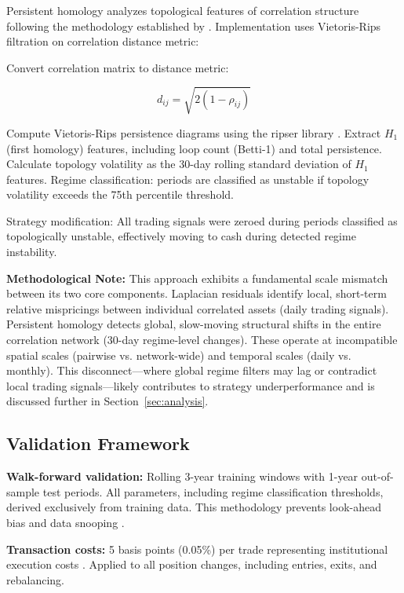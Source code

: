 Persistent homology analyzes topological features of correlation structure following the methodology established by \citet{Gidea2018}. Implementation uses Vietoris-Rips filtration on correlation distance metric:

Convert correlation matrix to distance metric:

\begin{equation}
d_{ij} = \sqrt{2(1 - \rho_{ij})}
\end{equation}

Compute Vietoris-Rips persistence diagrams using the ripser library \citep{Tralie2018}. Extract $H_1$ (first homology) features, including loop count (Betti-1) and total persistence. Calculate topology volatility as the 30-day rolling standard deviation of $H_1$ features. Regime classification: periods are classified as unstable if topology volatility exceeds the 75th percentile threshold.

Strategy modification: All trading signals were zeroed during periods classified as topologically unstable, effectively moving to cash during detected regime instability.

\textbf{Methodological Note:} This approach exhibits a fundamental scale mismatch between its two core components. Laplacian residuals identify local, short-term relative mispricings between individual correlated assets (daily trading signals). Persistent homology detects global, slow-moving structural shifts in the entire correlation network (30-day regime-level changes). These operate at incompatible spatial scales (pairwise vs. network-wide) and temporal scales (daily vs. monthly). This disconnect---where global regime filters may lag or contradict local trading signals---likely contributes to strategy underperformance and is discussed further in Section~\ref{sec:analysis}.

\subsection{Validation Framework}

\textbf{Walk-forward validation:} Rolling 3-year training windows with 1-year out-of-sample test periods. All parameters, including regime classification thresholds, derived exclusively from training data. This methodology prevents look-ahead bias and data snooping \citep{Bailey2014, dePrado2018}.

\textbf{Transaction costs:} 5 basis points (0.05\%) per trade representing institutional execution costs \citep{Frazzini2018}. Applied to all position changes, including entries, exits, and rebalancing.

